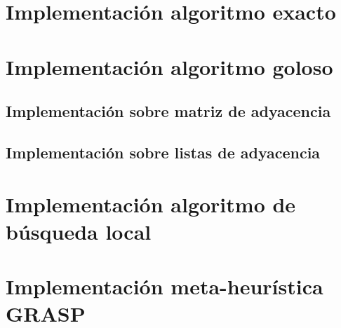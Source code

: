 \lstset{breaklines=true}

\newpage
\section{Implementación algoritmo exacto}


\newpage
\section{Implementación algoritmo goloso}

\subsection{Implementación sobre matriz de adyacencia}


\subsection{Implementación sobre listas de adyacencia}


\newpage
\section{Implementación algoritmo de búsqueda local}


\newpage
\section{Implementación meta-heurística GRASP}

